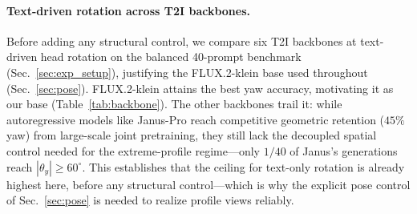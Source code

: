 \paragraph{Text-driven rotation across T2I backbones.}
Before adding any structural control, we compare six T2I backbones at text-driven
head rotation on the balanced 40-prompt benchmark (Sec.~\ref{sec:exp_setup}),
justifying the FLUX.2-klein base used throughout (Sec.~\ref{sec:pose}).
FLUX.2-klein attains the best yaw accuracy, motivating it as our base
(Table~\ref{tab:backbone}). The other backbones trail it: while autoregressive
models like Janus-Pro reach competitive geometric retention ($45\%$ yaw) from
large-scale joint pretraining, they still lack the decoupled spatial control
needed for the extreme-profile regime---only $1/40$ of Janus's generations reach
$|\theta_y|{\geq}60^\circ$. This establishes that the ceiling for text-only
rotation is already highest here, before any structural control---which is why the
explicit pose control of Sec.~\ref{sec:pose} is needed to realize profile views
reliably.

\begin{table}[t]\centering\small
\setlength{\tabcolsep}{5pt}
\caption[Text-driven head rotation across six T2I backbones]{\textbf{Text-driven head rotation across six T2I backbones} ($40$ pose
prompts, one image each; accuracy in \%, $|\theta_y|$ in degrees). FLUX.2-klein
attains the best yaw accuracy while turning the head substantially; the remaining
backbones trail it---the autoregressive Janus-Pro rotates ($45\%$ yaw) from
large-scale pretraining but rarely reaches extreme profile ($1/40$ at
$|\theta_y|{\geq}60^\circ$). We adopt FLUX.2-klein as the base backbone.}
\label{tab:backbone}
\end{table}

